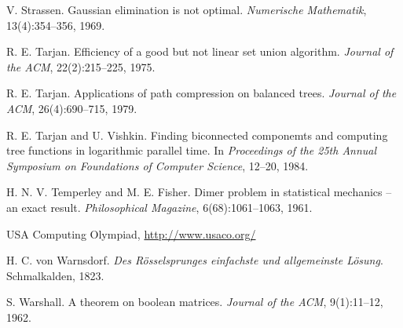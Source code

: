\begin{thebibliography}{9}
  V. Strassen.
  Gaussian elimination is not optimal.
  \emph{Numerische Mathematik}, 13(4):354--356, 1969.

  R. E. Tarjan.
  Efficiency of a good but not linear set union algorithm.
  \emph{Journal of the ACM}, 22(2):215--225, 1975.

  R. E. Tarjan.
  Applications of path compression on balanced trees.
  \emph{Journal of the ACM}, 26(4):690--715, 1979.

  R. E. Tarjan and U. Vishkin.
  Finding biconnected componemts and computing tree functions in logarithmic parallel time.
  In \emph{Proceedings of the 25th Annual Symposium on Foundations of Computer Science}, 12--20, 1984.

  H. N. V. Temperley and M. E. Fisher.
  Dimer problem in statistical mechanics -- an exact result.
  \emph{Philosophical Magazine}, 6(68):1061--1063, 1961.

  USA Computing Olympiad, \url{http://www.usaco.org/}

  H. C. von Warnsdorf.
  \emph{Des Rösselsprunges einfachste und allgemeinste Lösung}.
  Schmalkalden, 1823.

  S. Warshall.
  A theorem on boolean matrices.
  \emph{Journal of the ACM}, 9(1):11--12, 1962.


\end{thebibliography}
